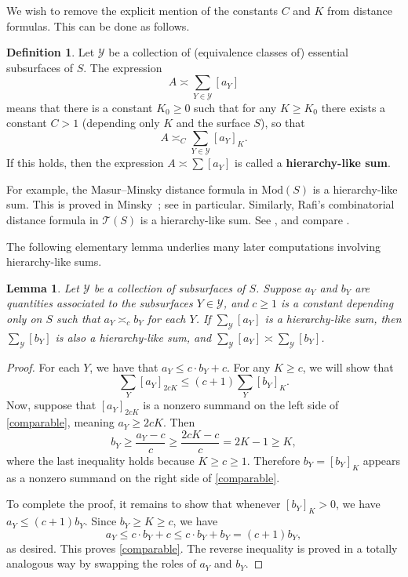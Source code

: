 \documentclass[11pt,letterpaper]{amsart}
\newcommand{\teich}{\mathcal T}
\numberwithin{equation}{section}
\newtheorem{lemma}[theorem]{Lemma}
\theoremstyle{definition}
\newtheorem{definition}[theorem]{Definition}
\newcommand{\Mod}{\mathrm{Mod}}
\newcommand{\define}[1]{\textbf{#1}}
\begin{document}
We wish to remove the explicit mention of the constants $C$ and $K$ from distance formulas. This can be done as follows.

\begin{definition}\label{Def:HierarchyLikeSum}
Let $\mathcal Y$ be a collection of (equivalence classes of) essential subsurfaces of $S$.
The expression
\[
A \asymp \sum_{Y \in \mathcal Y} [a_Y]
\]
means that there is a constant $K_0 \geq 0$ such that for any $K \geq K_0$ there exists a constant $C>1$ (depending only $K$ and the surface $S$), so that 
\[
A \asymp_C \sum_{Y \in \mathcal Y} [a_Y]_K.
\]
If this holds, then the expression $A \asymp \sum [a_Y]$ is called a \define{hierarchy-like sum}.
\end{definition}

For example, the Masur--Minsky distance formula in $\Mod (S)$ \cite[Theorem 6.12]{MasurMinsky2} is a hierarchy-like sum. This is proved in Minsky~\cite[Section 9.4]{Minsky:ModelsBounds}; see \cite[Lemma 9.6]{Minsky:ModelsBounds} in particular. Similarly, Rafi's combinatorial distance formula in $\teich(S)$ \cite[Theorem 6.1]{Rafi:Combinatorial} is a hierarchy-like sum. See \cite[Remark 2.5]{Rafi:Hyperbolicity}, and compare .

The following elementary lemma underlies many later computations involving hierarchy-like sums.

\begin{lemma}
\label{Lem:HierarchyLikeSum}
Let $\mathcal Y$ be a collection of subsurfaces of $S$. Suppose $a_Y$ and $b_Y$ are quantities associated to the subsurfaces $Y \in \mathcal Y$, and $c \geq 1$ is a constant depending only on $S$ such that $a_Y \asymp_c b_Y$ for each $Y$. If $ \sum_{\mathcal Y}  [a_Y]$ is a hierarchy-like sum, then $\sum_{\mathcal Y} [b_Y]$ is also a hierarchy-like sum, and $\sum_{\mathcal Y}  [a_Y] \asymp \sum_{\mathcal Y} [b_Y]$.
\end{lemma}

\begin{proof}
 For each $Y$, we have that $a_{Y} \leq c \cdot b_{Y} + c$.  For any $K \geq c$, we will show that
 \begin{equation} \label{comparable}
 \sum_{Y} [a_Y]_{2cK} \leq (c+1) \sum_{Y} [b_Y]_{K}. 
 \end{equation}
 Now, suppose that $[a_Y]_{2cK}$ is a nonzero summand on the left side of \eqref{comparable}, meaning $a_{Y} \geq 2cK$. 
 Then
 \[ b_{Y} \geq \frac{a_{Y}- c}{c} \geq \frac{2cK -c}{c} = 2K-1 \geq K, \]
where the last inequality holds because $K \geq c \geq 1$. Therefore $b_Y = [b_Y]_K$ appears as a nonzero summand on the right side of \eqref{comparable}. 

To complete the proof, it remains to show that whenever $[b_Y]_K > 0$, we have $a_Y \leq (c+1) b_Y$. Since $b_Y \geq K \geq c$, we have
\[
a_Y \leq c \cdot b_Y + c \leq c \cdot b_Y + b_Y = (c+1) b_Y,
\]
as desired. This proves \eqref{comparable}.
The reverse inequality is proved in a totally analogous way by swapping the roles of $a_Y$ and $b_Y$. 
\end{proof}
\end{document}
